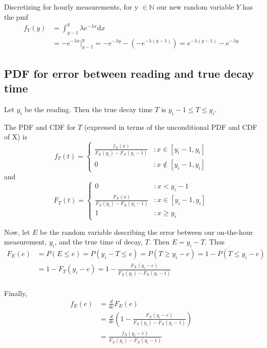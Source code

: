 \documentclass[paper=a4, fontsize=11pt]{scrartcl} %
\numberwithin{equation}{section} %
\numberwithin{figure}{section} %
\numberwithin{table}{section} %
\begin{document}
Discretizing for hourly measurements, for y $\in \mathbb{N}$ our new random variable $Y$ has the pmf 
\begin{align*}
f_Y(y)& = \int_{y-1}^{y} \lambda e^{-\lambda x} \mathrm{d}x\\
& = -e^{-\lambda x} \Big|_{y-1}^y= -e^{-\lambda y} - (-e^{-\lambda (y-1)}) = e^{-\lambda(y-1)} - e^{-\lambda y}
\end{align*}

\subsection{PDF for error between reading and true decay time}

Let $y_i$ be the reading. Then the true decay time $T$ is $y_i-1 \leq T \leq y_i$.

The PDF and CDF for $T$ (expressed in terms of the unconditional PDF and CDF of X) is 
 \begin{displaymath}
   f_T(t) = \left\{
     \begin{array}{lr}
        \frac{f_X(x)}{F_X(y_i) - F_X(y_i-1)} & : x \in [y_i-1,y_i]\\
       0 & : x \notin [y_i-1,y_i]
     \end{array}
   \right.
\end{displaymath} 
and
 \begin{displaymath}
   F_T(t) = \left\{
     \begin{array}{lr}
       0 & : x < y_i -1\\
        \frac{F_X(x)}{F_X(y_i) - F_X(y_i-1)} & : x \in [y_i-1,y_i]\\
       1 & : x \geq y_i
     \end{array}
   \right.
\end{displaymath} 


Now, let $E$ be the random variable describing the error between our on-the-hour measurement, $y_i$, and the true time of decay, $T$. Then $E = y_i - T$. Thus
\begin{align*}
F_E(e) &= P(E \leq e) = P(y_i - T \leq e) = P (T \geq y_i - e) = 1 - P(T \leq y_i - e)\\
   & = 1 - F_T(y_i-e) = 1 - \frac{F_X(y_i-e)}{F_X(y_i) - F_X(y_i-1)}\\
\end{align*}

Finally, 
\begin{align*}
f_E(e) &= \frac{d}{de}F_E(e)\\
   &= \frac{d}{de}(1-\frac{F_X(y_i-e)}{F_X(y_i) - F_X(y_i-1)})\\
   &= \frac{f_X(y_i-e)}{F_X(y_i) - F_X(y_i-1)}
\end{align*}
\end{document}
